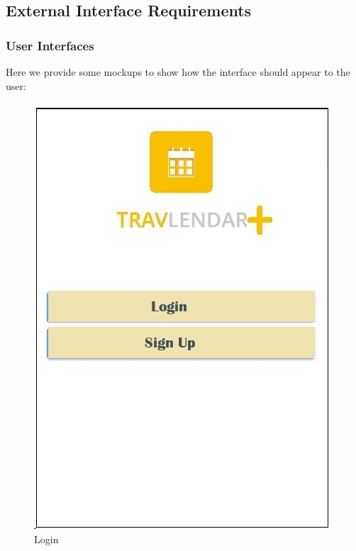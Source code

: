 \subsection{External Interface Requirements}
	\subsubsection{User Interfaces}
		Here we provide some mockups to show how the interface should appear to the user:\newline
		
		\begin{figure}[H]	
			\centerline{\includegraphics[scale=0.4]{Images/Login}}
			\caption{Login}
		\end{figure}	

